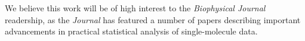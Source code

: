 \documentclass[ucb,qb3,10pt,fullfrom]{ucletter}
\begin{document}
\begin{letter}{}
We believe this work will be of high interest to the \emph{Biophysical Journal} readership, as the \emph{Journal} has featured a number of papers describing important advancements in  practical statistical analysis of single-molecule data.



\end{letter}
\end{document}
